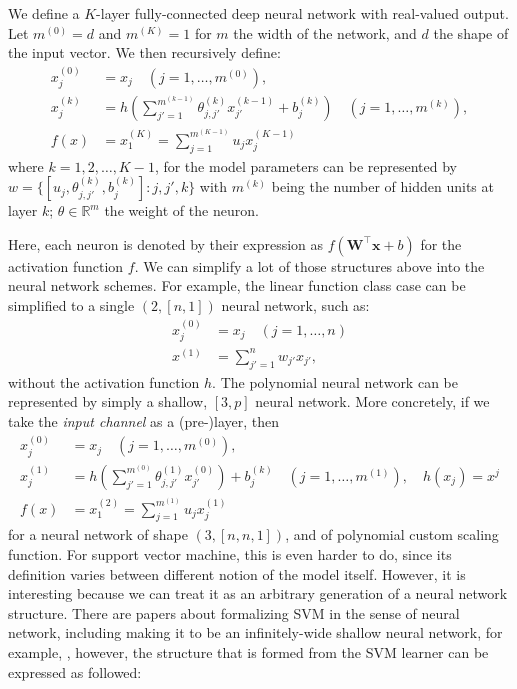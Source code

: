 \documentclass[
  journal=largetwo,
  year=2025,
  volume=37,
]{cup-journal}
\begin{document}
\begin{definition}
    We define a $K$-layer fully-connected deep neural network with real-valued output. Let $m^{(0)}=d$ and $m^{(K)}=1$ for $m$ the width of the network, and $d$ the shape of the input vector. We then recursively define: 
\begin{align}
    x_{j}^{(0)} &= x_{j} \quad (j=1,\dots,m^{(0)}),\\ 
    x_{j}^{(k)} &= h\left(\sum^{m^{(k-1)}}_{j'=1} \theta_{j,j'}^{(k)}x_{j'}^{(k-1)}+ b_{j}^{(k)}\right)\quad (j=1,\dots,m^{(k)}),\\
    f(x) & = x_{1}^{(K)} = \sum^{m^{(K-1)}}_{j=1} u_{j}x_{j}^{(K-1)}
\end{align}
where $k = 1,2,\dots,K-1$, for the model parameters can be represented by $w=\{[u_{j}, \theta_{j,j'}^{(k)}, b_{j}^{(k)}]: j,j',k\}$ with $m^{(k)}$ being the number of hidden units at layer $k$; $\theta\in \mathbb{R}^{m}$ the weight of the neuron.
\end{definition}

Here, each neuron is denoted by their expression as $f(\mathbf{W}^{\top}\mathbf{x}+b)$ for the activation function $f$. We can simplify a lot of those structures above into the neural network schemes. For example, the linear function class case can be simplified to a single $(2,[n,1])$ neural network, such as: 
\begin{align}
    x^{(0)}_{j} &= x_{j} \quad (j=1,\dots,n)\\
    x^{(1)} &= \sum_{j'=1}^{n} w_{j'}x_{j'}, 
\end{align}
without the activation function $h$. The polynomial neural network can be represented by simply a shallow, $[3,p]$ neural network. More concretely, if we take the \textit{input channel} as a (pre-)layer, then
\begin{align}
    x_{j}^{(0)} &= x_{j} \quad (j=1,\dots,m^{(0)}),\\ 
    x_{j}^{(1)} &= h\left(\sum^{m^{(0)}}_{j'=1} \theta_{j,j'}^{(1)}x_{j'}^{(0)} \right)+b_{j}^{(k)}\quad (j=1,\dots,m^{(1)}),\quad h(x_{j})=x^{j}\\
    f(x) & = x_{1}^{(2)} = \sum^{m^{(1)}}_{j=1} u_{j}x_{j}^{(1)}
\end{align}
for a neural network of shape $(3,[n,n,1])$, and of polynomial custom scaling function. For support vector machine, this is even harder to do, since its definition varies between different notion of the model itself. However, it is interesting because we can treat it as an arbitrary generation of a neural network structure. There are papers about formalizing SVM in the sense of neural network, including making it to be an infinitely-wide shallow neural network, for example, \cite{chen2021equivalence,wang2019svmdsn,zhang2014equivalence}, however, the structure that is formed from the SVM learner can be expressed as followed:
\end{document}

